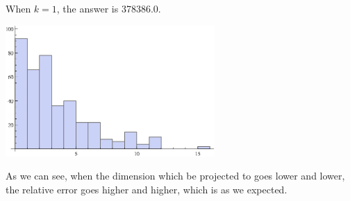 \documentclass[a4paper, 12pt]{mcshw}
\begin{document}
\begin{enumerate}
\begin{solution}
\begin{center}
        \end{center}
        When $k = 1$, the answer is 378386.0.
        \begin{center}
            \includegraphics[height=5cm]{1_gr8.eps}
        \end{center}
        As we can see, when the dimension which be projected to goes lower and lower, the relative error goes higher and higher, which is as we expected.
    \end{solution}
\end{enumerate}
\end{document}

